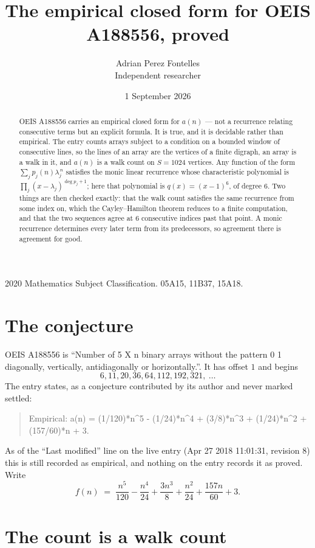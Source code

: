\documentclass[11pt,a4paper]{article}
\title{The empirical closed form for OEIS A188556, proved}
\author{Adrian Perez Fontelles\\ \small Independent researcher}
\date{1 September 2026}
\theoremstyle{plain}
\theoremstyle{definition}
\begin{document}
\maketitle

\begin{abstract}
OEIS A188556 carries an empirical closed form for $a(n)$ --- not a recurrence relating
consecutive terms but an explicit formula. It is true, and it is decidable rather than
empirical. The entry counts arrays subject to a condition on a bounded window of consecutive lines, so the lines of an array are the
vertices of a finite digraph, an array is a walk in it, and $a(n)$ is a walk count on
$S=1024$ vertices. Any function of the form $\sum_j p_j(n)\lambda_j^{\,n}$ satisfies the
monic linear recurrence whose characteristic polynomial is
$\prod_j(x-\lambda_j)^{\deg p_j+1}$; here that polynomial is $q(x)=(x-1)^{6}$, of degree
$6$. Two things are then checked exactly: that the walk count satisfies the same
recurrence from some index on, which the Cayley--Hamilton theorem reduces to a finite
computation, and that the two sequences agree at $6$ consecutive indices past that
point. A monic recurrence determines every later term from its predecessors, so agreement
there is agreement for good.
\end{abstract}

\noindent\small 2020 Mathematics Subject Classification. 05A15, 11B37, 15A18.\normalsize

\section{The conjecture}

OEIS A188556 is ``Number of 5 X n binary arrays without the pattern 0 1 diagonally, vertically, antidiagonally or horizontally.''. It has offset $1$ and begins
\[
6, 11, 20, 36, 64, 112, 192, 321,\ \dots
\]
The entry states, as a conjecture contributed by its author and never marked settled:
\begin{quote}
Empirical: a(n) = (1/120)*n\^{}5 - (1/24)*n\^{}4 + (3/8)*n\^{}3 + (1/24)*n\^{}2 + (157/60)*n + 3.
\end{quote}
As of the ``Last modified'' line on the live entry (Apr 27 2018 11:01:31, revision 8) this is still
recorded as empirical, and nothing on the entry records it as proved. Write
\[
f(n)\;=\;\frac{n^{5}}{120} - \frac{n^{4}}{24} + \frac{3 n^{3}}{8} + \frac{n^{2}}{24} + \frac{157 n}{60} + 3.
\]

\section{The count is a walk count}
\end{document}
